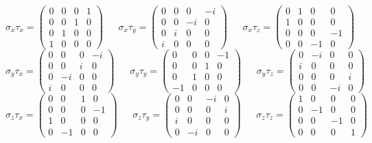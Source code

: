 \begin{equation*}
\sigma_x\tau_x=
\begin{pmatrix}
    0 & 0 & 0 & 1 \\
    0 & 0 & 1 & 0 \\
    0 & 1 & 0 & 0 \\
    1 & 0 & 0 & 0
\end{pmatrix}
~~~~~~~\sigma_x\tau_y=
\begin{pmatrix}
    0 & 0 & 0 & -i \\
    0 & 0 & -i & 0 \\
    0 & i & 0 & 0 \\
    i & 0 & 0 & 0
\end{pmatrix}
~~~~~~~\sigma_x\tau_z=
\begin{pmatrix}
    0 & 1 & 0 & 0 \\
    1 & 0 & 0 & 0 \\
    0 & 0 & 0 & -1 \\
    0 & 0 & -1 & 0
\end{pmatrix}
\end{equation*}
\begin{equation*}
\sigma_y\tau_x=
\begin{pmatrix}
    0 & 0 & 0 & -i \\
    0 & 0 & i & 0 \\
    0 & -i & 0 & 0 \\
    i & 0 & 0 & 0
\end{pmatrix}
~~~~~~~\sigma_y\tau_y=
\begin{pmatrix}
    0 & 0 & 0 & -1 \\
    0 & 0 & 1 & 0 \\
    0 & 1 & 0 & 0 \\
    -1 & 0 & 0 & 0
\end{pmatrix}
~~~~~~~\sigma_y\tau_z=
\begin{pmatrix}
    0 & -i & 0 & 0 \\
    i & 0 & 0 & 0 \\
    0 & 0 & 0 & i \\
    0 & 0 & -i & 0
\end{pmatrix}
\end{equation*}
\begin{equation*}
\sigma_z\tau_x=
\begin{pmatrix}
    0 & 0 & 1 & 0 \\
    0 & 0 & 0 & -1 \\
    1 & 0 & 0 & 0 \\
    0 & -1 & 0 & 0
\end{pmatrix}
~~~~~~~\sigma_z\tau_y=
\begin{pmatrix}
    0 & 0 & -i & 0 \\
    0 & 0 & 0 & i \\
    i & 0 & 0 & 0 \\
    0 & -i & 0 & 0
\end{pmatrix}
~~~~~~~\sigma_z\tau_z=
\begin{pmatrix}
    1 & 0 & 0 & 0 \\
    0 & -1 & 0 & 0 \\
    0 & 0 & -1 & 0 \\
    0 & 0 & 0 & 1
\end{pmatrix}
\end{equation*}

